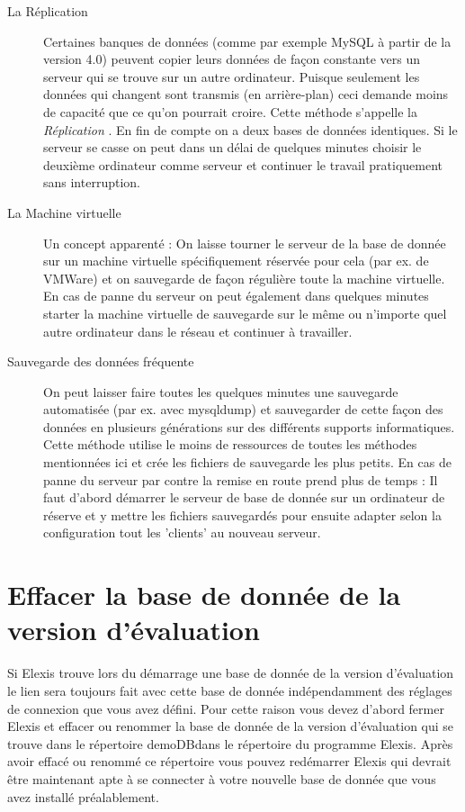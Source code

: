 \begin{description}
\item[ La Réplication  ] Certaines banques de données (comme par exemple MySQL à partir de la version 4.0) peuvent copier leurs données de façon constante vers un serveur qui se trouve sur un autre ordinateur. Puisque seulement les données qui changent sont transmis (en arrière-plan) ceci demande moins de capacité que ce qu'on pourrait croire. Cette méthode s'appelle la  \textit{Réplication} . En fin de compte on a deux bases de données identiques. Si le serveur se casse on peut dans un délai de quelques minutes choisir le deuxième ordinateur comme serveur et continuer le travail pratiquement sans interruption.
\item [La Machine virtuelle ] Un concept apparenté : On laisse tourner le serveur de la base de donnée sur un machine virtuelle spécifiquement réservée pour cela (par ex. de VMWare) et on sauvegarde de façon régulière toute la machine virtuelle. En cas de panne du serveur on peut également dans quelques minutes starter la machine virtuelle de sauvegarde sur le même ou n'importe quel autre ordinateur dans le réseau et continuer à travailler.
\item [Sauvegarde des données fréquente ] On peut laisser faire toutes les quelques minutes une sauvegarde automatisée (par ex. avec mysqldump) et sauvegarder de cette façon des données en plusieurs générations sur des différents supports informatiques. Cette méthode utilise le moins de ressources de toutes les méthodes mentionnées ici et crée les fichiers de sauvegarde les plus petits. En cas de panne du serveur par contre la remise en route prend plus de temps : Il faut d'abord démarrer le serveur de base de donnée sur un ordinateur de réserve et y mettre les fichiers sauvegardés pour ensuite adapter selon la configuration tout les 'clients' au nouveau serveur.
\end{description}

\section{Effacer la base de donnée de la version d'évaluation}
Si Elexis trouve lors du démarrage une base de donnée de la version d'évaluation le lien sera toujours fait avec cette base de donnée indépendamment des réglages de connexion que vous avez défini. Pour cette raison vous devez d'abord fermer Elexis et effacer ou renommer la base de donnée de la version d'évaluation qui se trouve dans le répertoire  \glqq demoDB\grqq{}dans le répertoire du programme Elexis. Après avoir effacé ou renommé ce répertoire vous pouvez redémarrer Elexis qui devrait être maintenant apte à se connecter à votre nouvelle base de donnée que vous avez installé préalablement.

